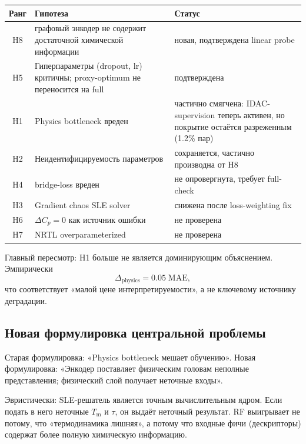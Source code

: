 \documentclass[11pt]{article}
\begin{document}
\begin{center}
\small
\begin{tabular}{|c|p{7.6cm}|p{4.0cm}|}
\hline
\textbf{Ранг} & \textbf{Гипотеза} & \textbf{Статус} \\
\hline
H8 & графовый энкодер не содержит достаточной химической информации & новая, подтверждена linear probe \\
\hline
H5 & Гиперпараметры (dropout, lr) критичны; proxy-optimum не переносится на full & подтверждена \\
\hline
H1 & Physics bottleneck вреден & частично смягчена: IDAC-supervision теперь активен, но покрытие остаётся разреженным (1.2\% пар) \\
\hline
H2 & Неидентифицируемость параметров & сохраняется, частично производна от H8 \\
\hline
H4 & bridge-loss вреден & не опровергнута, требует full-check \\
\hline
H3 & Gradient chaos SLE solver & снижена после loss-weighting fix \\
\hline
H6 & $\Delta C_p=0$ как источник ошибки & не проверена \\
\hline
H7 & NRTL overparameterized & не проверена \\
\hline
\end{tabular}
\normalsize
\end{center}

Главный пересмотр: H1 больше не является доминирующим объяснением. Эмпирически
\begin{equation*}
\Delta_{\mathrm{physics}}=0.05\;\mathrm{MAE},
\end{equation*}
что соответствует «малой цене интерпретируемости», а не ключевому источнику деградации.

\subsection{Новая формулировка центральной проблемы}

Старая формулировка: «Physics bottleneck мешает обучению».\newline
Новая формулировка: «Энкодер поставляет физическим головам неполные представления; физический слой получает неточные входы».

Эвристически: SLE-решатель является точным вычислительным ядром. Если подать в него неточные $T_{\mathrm{m}}$ и $\tau$, он выдаёт неточный результат. RF выигрывает не потому, что «термодинамика лишняя», а потому что входные фичи (дескрипторы) содержат более полную химическую информацию.
\end{document}
